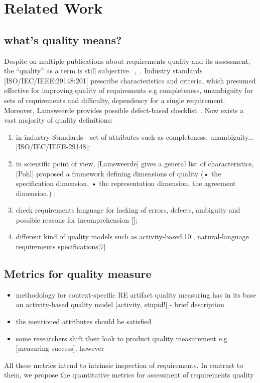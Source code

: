\section{Related Work}
\label{sec:relatedwork} 

\subsection{what's quality means?}

Despite on multiple publications about requirements quality and its assessment, the ``quality'' as a term is still subjective.~\cite{Mund:2017},~\cite{Femmer:2017}.
Industry standards [ISO/IEC/IEEE:29148:201] prescribe characteristics and criteria, which presumed effective for improving quality of requirements e.g completeness, unambiguity for sets of requirements and difficulty, dependency for a single requirement. Moreover, Lamsweerde provides possible defect-based checklist~\cite{Lamsweerde:2009}.
Now exists a vast majority of quality definitions:
\begin{enumerate}
	\item in industry Standards - set of attributes such as completeness, unambiguity... [ISO/IEC/IEEE-29148];
	\item in scientific point of view, [Lamsweerde] gives a general list of characteristics, [Pohl] proposed a framework defining dimensions of quality (• the specification dimension, • the representation dimension, the agreement dimension.) ;
	\item check requirements language for lacking of errors, defects, ambiguity and possible reasons for incomprehension [];
	\item different kind of quality models such as activity-based[10], natural-language requirements specifications[7] %
\end{enumerate}


\subsection{Metrics for quality measure}
\begin{itemize}
	\item methodology for context-specific RE artifact quality measuring has in its base an activity-based quality model [activity, stupid!] - brief description
	\item the mentioned attributes should be satisfied 
	\item some researchers shift their look to product quality measurement e.g [measuring success], however 
\end{itemize}

All these metrics intend to intrinsic inspection of requirements. In contrast to them, we propose the quantitative metrics for assessment of requirements quality